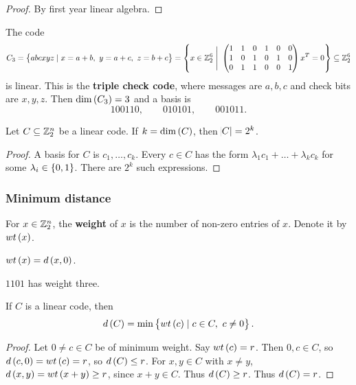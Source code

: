 \begin{proof}
By first year linear algebra.
\end{proof}

\begin{example*}
The code
$$ C_3 = \cbr{abcxyz \mid x = a + b, \ y = a + c, \ z = b + c} = \cbr{x \in \Z_2^6 \ \Bigg| \ \threebythree{1 & 1}{0 & 1}{0 & 0}{1 & 0}{1 & 0}{1 & 0}{0 & 1}{1 & 0}{0 & 1}x^T = 0} \subseteq \Z_2^6 $$
is linear. This is the \textbf{triple check code}, where messages are $ a, b, c $ and check bits are $ x, y, z $. Then $ \dim\br{C_3} = 3 $ and a basis is
$$ 100110, \qquad 010101, \qquad 001011. $$
\end{example*}

\begin{proposition}
Let $ C \subseteq \mathbb{Z}_2^n $ be a linear code. If $ k = \dim\br{C} $, then $ \abs{C} = 2^k $.
\end{proposition}

\begin{proof}
A basis for $ C $ is $ c_1, \dots, c_k $. Every $ c \in C $ has the form $ \lambda_1c_1 + \dots + \lambda_kc_k $ for some $ \lambda_i \in \cbr{0, 1} $. There are $ 2^k $ such expressions.
\end{proof}

\subsubsection{Minimum distance}

\begin{definition*}
For $ x \in \mathbb{Z}_2^n $, the \textbf{weight} of $ x $ is the number of non-zero entries of $ x $. Denote it by $ wt\br{x} $.
\end{definition*}

\begin{note*}
$ wt\br{x} = d\br{x, 0} $.
\end{note*}

\begin{example*}
$ 1101 $ has weight three.
\end{example*}

\begin{proposition}
\label{prop:1.5}
If $ C $ is a linear code, then
$$ d\br{C} = \min\cbr{wt\br{c} \mid c \in C, \ c \ne 0}. $$
\end{proposition}

\begin{proof}
Let $ 0 \ne c \in C $ be of minimum weight. Say $ wt\br{c} = r $. Then $ 0, c \in C $, so $ d\br{c, 0} = wt\br{c} = r $, so $ d\br{C} \le r $. For $ x, y \in C $ with $ x \ne y $, $ d\br{x, y} = wt\br{x + y} \ge r $, since $ x + y \in C $. Thus $ d\br{C} \ge r $. Thus $ d\br{C} = r $.
\end{proof}

